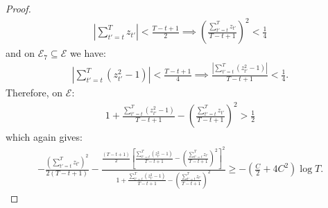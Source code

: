 \begin{proof}
\begin{align*}
     \left|\sum_{t'=t}^T z_{t'}\right| < \frac{T-t+1}{2} \implies  \left(\frac{\sum_{t'=t}^T z_{t'}}{T-t+1}\right)^2 < \frac{1}{4}
\end{align*}
and on $\mathcal{E}_7 \subseteq \mathcal{E}$ we have: 
\begin{align*}
     \left|\sum_{t'=t}^T (z_{t'}^2-1)\right| < \frac{T-t+1}{4} \implies  \frac{\left|\sum_{t'=t}^T (z_{t'}^2-1)\right|}{T-t+1} < \frac{1}{4}.
\end{align*}
Therefore, on $\mathcal{E}$:
\begin{align*}
    1 + \frac{\sum_{t'=t}^T (z_{t'}^2-1)}{T-t+1} - \left(\frac{\sum_{t'=t}^T z_{t'}}{T-t+1}\right)^2 > \frac{1}{2}
\end{align*}
which again gives:
\begin{align*}
     - \frac{\left(\sum_{t'=t}^T z_{t'}\right)^2}{2(T-t+1)} - \frac{\frac{(T-t+1)}{2}\left[\frac{\sum_{t'=t}^T (z_{t'}^2-1)}{T-t+1} - \left(\frac{\sum_{t'=t}^T z_{t'}}{T-t+1}\right)^2 \right]^2}{1 + \frac{\sum_{t'=t}^T (z_{t'}^2-1)}{T-t+1} - \left(\frac{\sum_{t'=t}^T z_{t'}}{T-t+1}\right)^2 } \geq - \left(\frac{C}{2} + 4C^2\right)\log T.
\end{align*}


\end{proof}
